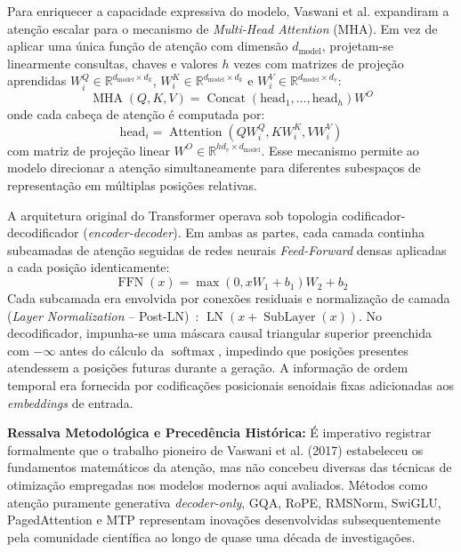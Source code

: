 \documentclass[10pt,a4paper,twocolumn]{article}
\begin{document}
Para enriquecer a capacidade expressiva do modelo, Vaswani et al. expandiram a aten\c{c}\~ao escalar para o mecanismo de \emph{Multi-Head Attention} (MHA). Em vez de aplicar uma \'unica fun\c{c}\~ao de aten\c{c}\~ao com dimens\~ao $d_{\text{model}}$, projetam-se linearmente consultas, chaves e valores $h$ vezes com matrizes de proje\c{c}\~ao aprendidas $W_i^Q \in \mathbb{R}^{d_{\text{model}} \times d_k}$, $W_i^K \in \mathbb{R}^{d_{\text{model}} \times d_k}$ e $W_i^V \in \mathbb{R}^{d_{\text{model}} \times d_v}$:
\begin{equation}
\operatorname{MHA}(Q,K,V) = \operatorname{Concat}(\text{head}_1, \dots, \text{head}_h)W^O
\end{equation}
onde cada cabe\c{c}a de aten\c{c}\~ao \'e computada por:
\begin{equation}
\text{head}_i = \operatorname{Attention}(QW_i^Q, KW_i^K, VW_i^V)
\end{equation}
com matriz de proje\c{c}\~ao linear $W^O \in \mathbb{R}^{h d_v \times d_{\text{model}}}$. Esse mecanismo permite ao modelo direcionar a aten\c{c}\~ao simultaneamente para diferentes subespa\c{c}os de representa\c{c}\~ao em m\'ultiplas posi\c{c}\~oes relativas.

A arquitetura original do Transformer operava sob topologia codificador-decodificador (\emph{encoder-decoder}). Em ambas as partes, cada camada continha subcamadas de aten\c{c}\~ao seguidas de redes neurais \emph{Feed-Forward} densas aplicadas a cada posi\c{c}\~ao identicamente:
\begin{equation}
\operatorname{FFN}(x) = \max(0, xW_1 + b_1)W_2 + b_2
\end{equation}
Cada subcamada era envolvida por conex\~oes residuais e normaliza\c{c}\~ao de camada (\emph{Layer Normalization} -- Post-LN)~\cite{ba2016}: $\operatorname{LN}(x + \operatorname{SubLayer}(x))$. No decodificador, impunha-se uma m\'ascara causal triangular superior preenchida com $-\infty$ antes do c\'alculo da $\operatorname{softmax}$, impedindo que posi\c{c}\~oes presentes atendessem a posi\c{c}\~oes futuras durante a gera\c{c}\~ao. A informa\c{c}\~ao de ordem temporal era fornecida por codifica\c{c}\~oes posicionais senoidais fixas adicionadas aos \emph{embeddings} de entrada.

\textbf{Ressalva Metodol\'ogica e Preced\^encia Hist\'orica:} \'E imperativo registrar formalmente que o trabalho pioneiro de Vaswani et al. (2017) estabeleceu os fundamentos matem\'aticos da aten\c{c}\~ao, mas n\~ao concebeu diversas das t\'ecnicas de otimiza\c{c}\~ao empregadas nos modelos modernos aqui avaliados. M\'etodos como aten\c{c}\~ao puramente generativa \emph{decoder-only}, GQA, RoPE, RMSNorm, SwiGLU, PagedAttention e MTP representam inova\c{c}\~oes desenvolvidas subsequentemente pela comunidade cient\'ifica ao longo de quase uma d\'ecada de investiga\c{c}\~oes.
\end{document}
